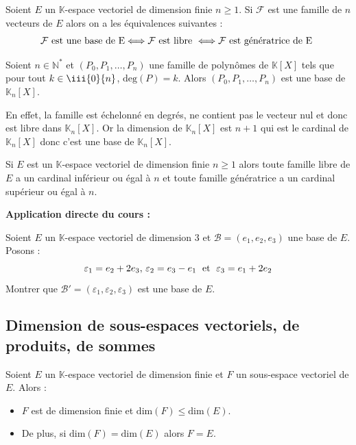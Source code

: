 \documentclass[french,11pt,twoside]{VcCours}
\newenvironment{ApplicationDirecte}{\textbf{Application directe du cours :}

}{}
\begin{document}
 \begin{Proposition}{}
 Soient $E$ un $\mathbb{K}$-espace vectoriel de dimension finie $n \geq 1$. Si $\mathcal{F}$ est une famille de $n$ vecteurs de $E$ alors on a les équivalences suivantes : 
$$ {\mathcal{F} \hbox{ est une base de E} \Longleftrightarrow \mathcal{F} \hbox{ est libre } \Longleftrightarrow \mathcal{F} \hbox{ est génératrice de E }}$$
\end{Proposition}

\begin{Exemple} Soient $n \in \mathbb{N}^*$ et $(P_0,P_1, \ldots, P_n)$ une famille de polynômes de $\mathbb{K}[X]$ tels que pour tout $k \in \iii{0}{n}$, $\textrm{deg}(P) = k$. Alors $(P_0,P_1, \ldots, P_n)$ est une base de $\mathbb{K}_n[X]$.

En effet, la famille est échelonné en degrés, ne contient pas le vecteur nul et donc est libre dans $\mathbb{K}_n[X]$. Or la dimension de $\mathbb{K}_n[X]$ est $n+1$ qui est le cardinal de $\mathbb{K}_n[X]$ donc c'est une base de $\mathbb{K}_n[X]$.
\end{Exemple}

\medskip

\begin{Remarque}{} Si $E$ est un $\mathbb{K}$-espace vectoriel de dimension finie $n \geq 1$ alors toute famille libre de $E$ a un cardinal inférieur ou égal à $n$ et toute famille génératrice a un cardinal supérieur ou égal à $n$.
\end{Remarque}

\begin{ApplicationDirecte} Soient $E$ un $\mathbb{K}$-espace vectoriel de dimension 3 et $\mathcal{B} = (e_{1} ,e_{2} ,e_{3})$ une base de $E$. Posons :
  \[
  \varepsilon_{1} = e_{2} + 2e_{3} , \, \varepsilon_{2} = e_{3} - e_{1} \; \hbox{ et } \; \varepsilon_{3} = e_{1} + 2e_{2}
  \]
Montrer que $\mathcal{B}' = (\varepsilon_{1} ,\varepsilon_{2} ,\varepsilon_{3})$ est une base de $E$.
\end{ApplicationDirecte}

\medskip
\subsection{Dimension de sous-espaces vectoriels, de produits, de sommes}

\begin{Proposition}{}  Soient $E$ un $\mathbb{K}$-espace vectoriel de dimension finie et $F$ un sous-espace vectoriel de $E$. Alors :

\begin{itemize}
\item $F$ est de dimension finie et $\textrm{dim}(F) \leq \textrm{dim}(E)$.
\item De plus, si $\textrm{dim}(F) = \textrm{dim}(E)$ alors $F=E$.
\end{itemize}
\end{Proposition}
\end{document}
